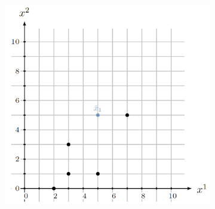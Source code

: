 \documentclass{article}
\begin{document}
\begin{figure}[h]
  \centering
  \begin{subfigure}[b]{0.4\linewidth}
      \centering
      \includegraphics[scale=0.5]{figs/PCAbyHand1}
  \end{subfigure}
  \quad
  \begin{subfigure}[t]{0.4\linewidth}
      \centering
  \end{subfigure}
\end{figure}

\medskip
\end{document}
